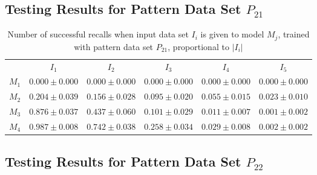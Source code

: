 \documentclass[anon]{CI}
\begin{document}
		\subsection{Testing Results for Pattern Data Set $P_{21}$}
		
		
		\begin{table}[H]
			\centering
			\def\arraystretch{1.5}
			\footnotesize
			\begin{tabular}{cccccc}
				
				& $I_{1}$  & $I_{2}$  & $I_{3}$  & $I_{4}$  & $I_{5}$ \\ \cline{2-6}
				$M_{1}$  & $0.000\pm0.000$  & $0.000\pm0.000$  & $0.000\pm0.000$  & $0.000\pm0.000$  & $0.000\pm0.000$ \\
				$M_{2}$  & $0.204\pm0.039$  & $0.156\pm0.028$  & $0.095\pm0.020$  & $0.055\pm0.015$  & $0.023\pm0.010$ \\
				$M_{3}$  & $0.876\pm0.037$  & $0.437\pm0.060$  & $0.101\pm0.029$  & $0.011\pm0.007$  & $0.001\pm0.002$ \\
				$M_{4}$  & $0.987\pm0.008$  & $0.742\pm0.038$  & $0.258\pm0.034$  & $0.029\pm0.008$  & $0.002\pm0.002$ \\
				
			\end{tabular}
			\caption{Number of successful recalls when input data set $I_i$ is given to model $M_j$, trained with pattern data set $P_{21}$, proportional to $\left|I_i\right|$}
		\end{table}
		
		\subsection{Testing Results for Pattern Data Set $P_{22}$}
		
		
\end{document}
